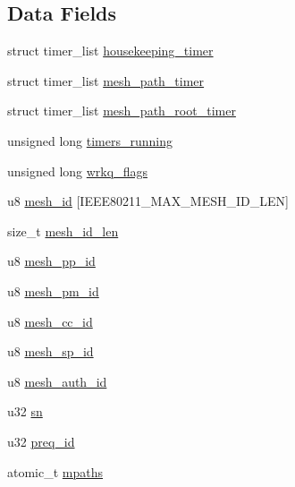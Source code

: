 \subsection*{Data Fields}
\begin{DoxyCompactItemize}
\item 
struct timer\-\_\-list \hyperlink{structieee80211__if__mesh_aedaac0553091bd2ddcc6d928973785d7}{housekeeping\-\_\-timer}
\item 
struct timer\-\_\-list \hyperlink{structieee80211__if__mesh_ac6aa531e38336119608446120beb1794}{mesh\-\_\-path\-\_\-timer}
\item 
struct timer\-\_\-list \hyperlink{structieee80211__if__mesh_a06ffe037b1a26965a1463ba7bf70e516}{mesh\-\_\-path\-\_\-root\-\_\-timer}
\item 
unsigned long \hyperlink{structieee80211__if__mesh_a17be34de946a3782a1daf2f20c1e913d}{timers\-\_\-running}
\item 
unsigned long \hyperlink{structieee80211__if__mesh_a108e8fea002f332c33b05d8ab571f494}{wrkq\-\_\-flags}
\item 
u8 \hyperlink{structieee80211__if__mesh_a2711e1d2c70fa6d2655834f90803d57b}{mesh\-\_\-id} \mbox{[}I\-E\-E\-E80211\-\_\-\-M\-A\-X\-\_\-\-M\-E\-S\-H\-\_\-\-I\-D\-\_\-\-L\-E\-N\mbox{]}
\item 
size\-\_\-t \hyperlink{structieee80211__if__mesh_a791aab7f12f13e6fa1f99f0eaf4fd7b0}{mesh\-\_\-id\-\_\-len}
\item 
u8 \hyperlink{structieee80211__if__mesh_a1dd8e1a94ceedad87851b023b7f53e6c}{mesh\-\_\-pp\-\_\-id}
\item 
u8 \hyperlink{structieee80211__if__mesh_a12e1b42980e196b8395edd3b7b00185a}{mesh\-\_\-pm\-\_\-id}
\item 
u8 \hyperlink{structieee80211__if__mesh_a50d32de091d16cc5ee16cdd8e9e61a45}{mesh\-\_\-cc\-\_\-id}
\item 
u8 \hyperlink{structieee80211__if__mesh_a082033acd11ca0e290b5d58e588129dc}{mesh\-\_\-sp\-\_\-id}
\item 
u8 \hyperlink{structieee80211__if__mesh_a5a1467a37395b9b885664f1885dfc199}{mesh\-\_\-auth\-\_\-id}
\item 
u32 \hyperlink{structieee80211__if__mesh_a3a5989b8e6d4286ac3822b65bbc1cf16}{sn}
\item 
u32 \hyperlink{structieee80211__if__mesh_a892d957726166f4493acf446b312e7a0}{preq\-\_\-id}
\item 
atomic\-\_\-t \hyperlink{structieee80211__if__mesh_a682324aeb04ad3c555c56e5cb52e53c5}{mpaths}
\item 

\end{DoxyCompactItemize}
